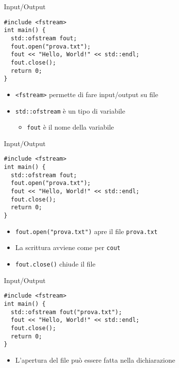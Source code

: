 \documentclass[xcolor=dvipsnames,handout]{beamer}
\begin{document}
\begin{frame}[fragile]{Input/Output}
  \vfill
  \begin{lstlisting}
#include <fstream>
int main() {
  std::ofstream fout;
  fout.open("prova.txt");
  fout << "Hello, World!" << std::endl;
  fout.close();
  return 0;
}
  \end{lstlisting}
  \vfill
  \begin{itemize}
    \item \lstinline$<fstream>$ permette di fare input/output su file
    \vfill
    \item \lstinline$std::ofstream$ è un tipo di variabile
    \begin{itemize}
      \item \lstinline$fout$ è il nome della variabile
    \end{itemize}
  \end{itemize}
  \vfill
\end{frame}

\begin{frame}[fragile]{Input/Output}
  \vfill
  \begin{lstlisting}
#include <fstream>
int main() {
  std::ofstream fout;
  fout.open("prova.txt");
  fout << "Hello, World!" << std::endl;
  fout.close();
  return 0;
}
  \end{lstlisting}
  \vfill
  \begin{itemize}
    \item \lstinline$fout.open("prova.txt")$ apre il file \lstinline$prova.txt$
    \vfill
    \item La scrittura avviene come per \lstinline$cout$
    \vfill
    \item \lstinline$fout.close()$ chiude il file
  \end{itemize}
  \vfill
\end{frame}

\begin{frame}[fragile]{Input/Output}
  \vfill
  \begin{lstlisting}
#include <fstream>
int main() {
  std::ofstream fout("prova.txt");
  fout << "Hello, World!" << std::endl;
  fout.close();
  return 0;
}
  \end{lstlisting}
  \vfill
  \begin{itemize}
    \item L'apertura del file può essere fatta nella dichiarazione
  \end{itemize}
  \vfill
\end{frame}
\end{document}

